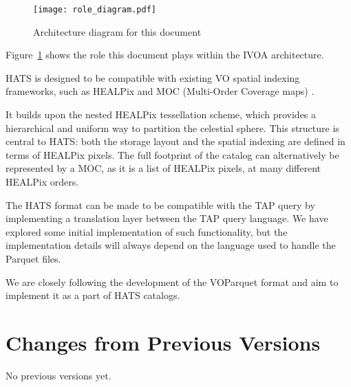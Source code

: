 \documentclass[11pt,a4paper]{ivoa}
\begin{document}
\begin{figure}
\centering

\texttt{[image: role\_diagram.pdf]}
\caption{Architecture diagram for this document}
\label{fig:archdiag}
\end{figure}

Figure~\ref{fig:archdiag} shows the role this document plays within the IVOA architecture.

HATS is designed to be compatible with existing VO spatial indexing frameworks, such as HEALPix \citep{gorski:healpix} and MOC (Multi-Order Coverage maps) \citep{ivoa:MOC}. \par
It builds upon the nested HEALPix tessellation scheme, which provides a hierarchical and uniform way to partition the celestial sphere. This structure is central to HATS: both the storage layout and the spatial indexing are defined in terms of HEALPix pixels.
The full footprint of the catalog can alternatively be represented by a MOC, as it is a list of HEALPix pixels, at many different HEALPix orders. \par 

The HATS format can be made to be compatible with the TAP query by implementing a translation layer between the TAP query language. 
We have explored some initial implementation of such functionality, but the implementation details will always depend on the language used to handle the Parquet files. \par

We are closely following the development of the VOParquet format and aim to implement it as a part of HATS catalogs.

\appendix
\section{Changes from Previous Versions}
No previous versions yet.
\end{document}
